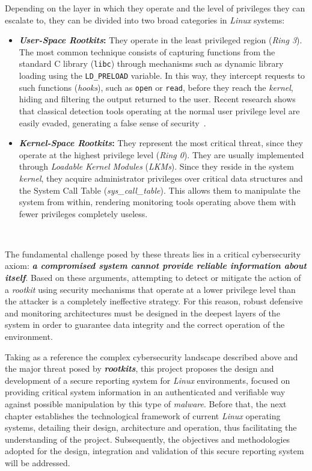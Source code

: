 Depending on the layer in which they operate and the level of privileges they can escalate to, they can be divided into two broad categories in \textit{Linux} systems:
\begin{itemize}
    \item \textbf{\textit{User-Space Rootkits}:} They operate in the least privileged region (\textit{Ring 3}).
    The most common technique consists of capturing functions from the standard C library (\texttt{libc}) through mechanisms such as dynamic library loading using the \texttt{LD\_PRELOAD} variable.
    In this way, they intercept requests to such functions (\textit{hooks}), such as \texttt{open} or \texttt{read}, before they reach the \textit{kernel}, hiding and filtering the output returned to the user.
    Recent research shows that classical detection tools operating at the normal user privilege level are easily evaded, generating a false sense of security~\cite{rootkits}.
    
    \item \textbf{\textit{Kernel-Space Rootkits}:} They represent the most critical threat, since they operate at the highest privilege level (\textit{Ring 0}).
    They are usually implemented through \textit{Loadable Kernel Modules} (\textit{LKMs}). Since they reside in the system \textit{kernel}, they acquire administrator privileges over critical data structures and the System Call Table (\textit{sys\_call\_table}).
    This allows them to manipulate the system from within, rendering monitoring tools operating above them with fewer privileges completely useless.
\end{itemize}

\

The fundamental challenge posed by these threats lies in a critical cybersecurity axiom: \textbf{\textit{a compromised system cannot provide reliable information about itself}}.
Based on these arguments, attempting to detect or mitigate the action of a \textit{rootkit} using security mechanisms that operate at a lower privilege level than the attacker is a completely ineffective strategy.
For this reason, robust defensive and monitoring architectures must be designed in the deepest layers of the system in order to guarantee data integrity and the correct operation of the environment.

\newpage

Taking as a reference the complex cybersecurity landscape described above and the major threat posed by \textbf{\textit{rootkits}}, this project proposes the design and development of a secure reporting system for \textit{Linux} environments, focused on providing critical system information in an authenticated and verifiable way against possible manipulation by this type of \textit{malware}.
Before that, the next chapter establishes the technological framework of current \textit{Linux} operating systems, detailing their design, architecture and operation, thus facilitating the understanding of the project.
Subsequently, the objectives and methodologies adopted for the design, integration and validation of this secure reporting system will be addressed.
